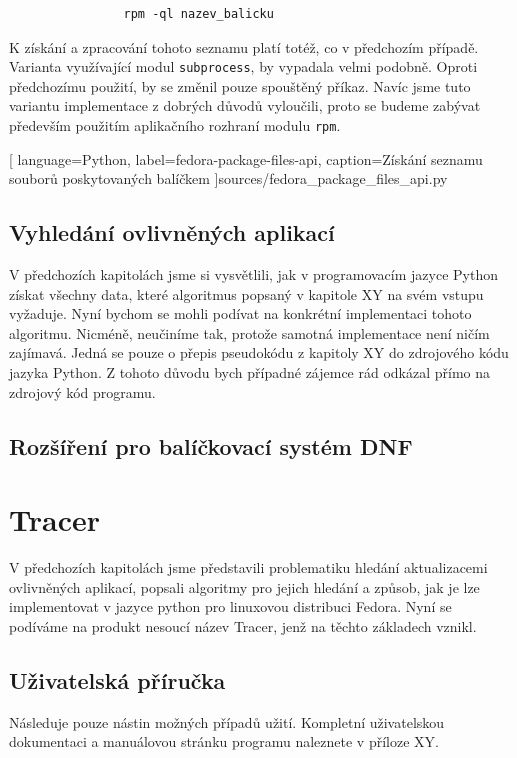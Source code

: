 \documentclass[10pt,a4paper]{article}
\begin{document}
			\begin{lstlisting}
				rpm -ql nazev_balicku
			\end{lstlisting}

			K získání a zpracování tohoto seznamu platí totéž, co v předchozím případě. Varianta využívající modul \texttt{subprocess}, by vypadala velmi podobně. Oproti předchozímu použití, by se změnil pouze spouštěný příkaz. Navíc jsme tuto variantu implementace z dobrých důvodů vyloučili, proto se budeme zabývat především použitím aplikačního rozhraní modulu \texttt{rpm}.

			\pagebreak
			
			[
				language=Python,
				label=fedora-package-files-api,
				caption={Získání seznamu souborů poskytovaných balíčkem}
			]{sources/fedora_package_files_api.py}

		\subsection{Vyhledání ovlivněných aplikací}
			V předchozích kapitolách jsme si vysvětlili, jak v programovacím jazyce Python získat všechny data, které algoritmus popsaný v kapitole XY na svém vstupu vyžaduje. Nyní bychom se mohli podívat na konkrétní implementaci tohoto algoritmu. Nicméně, neučiníme tak, protože samotná implementace není ničím zajímavá. Jedná se pouze o přepis pseudokódu z kapitoly XY do zdrojového kódu jazyka Python. Z tohoto důvodu bych případné zájemce rád odkázal přímo na zdrojový kód programu.

		\subsection{Rozšíření pro balíčkovací systém DNF}
	\newpage
	\section{Tracer}
		V předchozích kapitolách jsme představili problematiku hledání aktualizacemi ovlivněných aplikací, popsali algoritmy pro jejich hledání a způsob, jak je lze implementovat v jazyce python pro linuxovou distribuci Fedora. Nyní se podíváme na produkt nesoucí název Tracer, jenž na těchto základech vznikl.
		\subsection{Uživatelská příručka}
			Následuje pouze nástin možných případů užití. Kompletní uživatelskou dokumentaci a manuálovou stránku programu naleznete v příloze XY.
\end{document}
